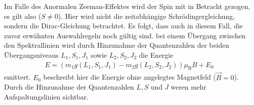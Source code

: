 Im Falle des Anormalen Zeeman-Effektes wird der Spin mit in Betracht gezogen, es
gilt also ($S \neq \num{0}$). Hier wird nicht die zeitabhängige Schrödingergleichung,
sondern die Dirac-Gleichung betrachtet. Es folgt, dass auch in diesem Fall, die
zuvor erwähnten Auswahlregeln noch gültig sind.
bei einem Übergang zwischen den Spektrallinien wird durch Hinzunahme der Quantenzahlen
der beiden Übergangsniveaus $L_1, S_1, J_1$ sowie $L_2, S_2, J_2$  die Energie
\begin{align}
  E = \left(m_1 g(L_1, S_1, J_1) - m_2 g(L_2, S_2, J_2) \right)\mu_\text{B} B + E_0
  \label{eqn:EnergieAufspaltung}
\end{align}
emittert. $E_0$ beschreibt hier die Energie ohne angelegtes Magnetfeld ($\vec{B} = \num{0}$).
Durch die Hinzunahme der Quantenzahlen $L, S$ und $J$ weren mehr Aufspaltungslinien
sichtbar.
